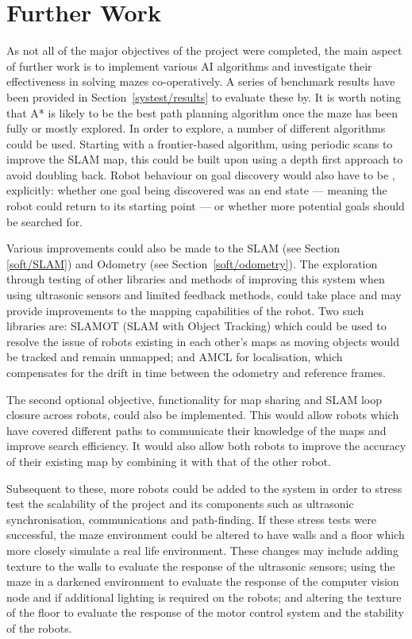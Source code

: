 
\chapter{Further Work}\label{furtherwork}
As not all of the major objectives of the project were completed, the main 
aspect of further work is to implement various AI algorithms and investigate 
their effectiveness in solving mazes co-operatively.  A series of benchmark 
results have been provided in Section~\ref{systest/results} to evaluate 
these by. It is worth noting that A* is likely to be the best path planning 
algorithm once the maze has been fully or mostly explored. In order to 
explore, a number of different algorithms could be used. Starting with a 
frontier-based algorithm, using periodic scans to improve the SLAM map, this 
could be built upon using a depth first approach to avoid doubling back. 
Robot behaviour on goal discovery would also have to be , explicitly: whether 
one goal being discovered was an end state --- meaning the robot could return 
to its starting point --- or whether more potential goals should be searched 
for.
  
Various improvements could also be made to the SLAM (see Section~
\ref{soft/SLAM}) and Odometry (see Section~\ref{soft/odometry}).  The 
exploration through testing of other libraries and methods of improving this 
system when using ultrasonic sensors and limited feedback methods, could take 
place and may provide improvements to the mapping capabilities of the robot. 
Two such libraries are: SLAMOT (SLAM with Object Tracking) which could be 
used to resolve the issue of robots existing in each other's maps as moving 
objects would be tracked and remain unmapped; and AMCL for localisation, 
which compensates for the drift in time between the odometry and reference 
frames.   

The second optional objective, functionality for map sharing and SLAM loop 
closure 
across robots, could also be implemented. This would allow robots which have covered 
different paths to communicate their knowledge of the maps and improve search 
efficiency. It would also allow both robots to improve the accuracy of their existing 
map by combining it with that of the other robot. 

Subsequent to these, more robots could be added to the system in order to 
stress test the scalability of the 
project and its components such as ultrasonic synchronisation, 
communications and path-finding. If these stress tests were successful, 
the maze environment could be altered to have walls and a floor which more 
closely simulate a real life environment. These changes may include adding 
texture to the walls to evaluate the response of the ultrasonic sensors; 
using the maze in a darkened environment to evaluate the response of the 
computer vision node and if additional lighting is required on the robots; 
and altering the texture of the floor to evaluate the response of the motor 
control system and the stability of the robots. 

